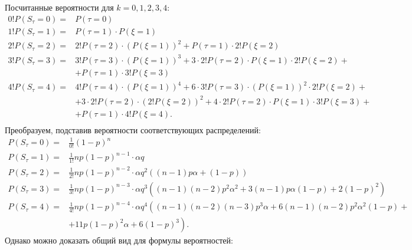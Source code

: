 \documentclass[12pt, specialist, subf, substylefile = spbu_report.rtx]{disser}
\begin{document}
	Посчитанные вероятности для $ k = 0, 1, 2, 3, 4 $:
	\[ 
	\begin{aligned}
		0! P(S _\tau = 0) =& P(\tau = 0)\\
		1! P(S _\tau = 1) =& P(\tau = 1) \cdot P(\xi = 1)\\
		2! P(S _\tau = 2) =& 2! P(\tau = 2) \cdot \left(P(\xi = 1)\right) ^2 + P(\tau = 1) \cdot 2!P(\xi = 2)\\
		3! P(S _\tau = 3) =& 3! P(\tau = 3) \cdot \left(P(\xi = 1)\right) ^3 + 3 \cdot 2!P(\tau = 2) \cdot P(\xi = 1) \cdot 2! P(\xi = 2) +\\
		&+ P(\tau = 1) \cdot 3!P(\xi = 3)\\
		4! P(S _\tau = 4) =& 4! P(\tau = 4) \cdot \left(P(\xi = 1)\right) ^4 + 6 \cdot 3! P(\tau = 3) \cdot \left(P(\xi = 1)\right) ^2 \cdot 2! P(\xi = 2) + \\
		&+ 3 \cdot 2! P(\tau = 2) \cdot \left(2! P(\xi = 2)\right) ^2 + 4 \cdot 2! P(\tau = 2) \cdot P(\xi = 1) \cdot 3! P(\xi = 3) +\\
		&+ P(\tau = 1) \cdot 4! P(\xi = 4).\\
	\end{aligned}
	\]
	Преобразуем, подставив вероятности соответствующих распределений:
	\[ 
	\begin{aligned}
		P(S _\tau = 0) =& \frac 1 {0!} (1 - p) ^n\\
		P(S _\tau = 1) =& \frac 1 {1!} n p (1 - p) ^{n - 1} \cdot \alpha q\\
		P(S _\tau = 2) =& \frac 1 {2!} n p (1 - p) ^{n - 2} \cdot \alpha q ^2 \left( (n - 1) p \alpha + (1 - p) \right)\\
		P(S _\tau = 3) =& \frac 1 {3!} n p (1 - p) ^{n - 3} \cdot \alpha q ^3 \left( (n - 1)(n - 2) p ^2 \alpha ^2 + 3 (n - 1) p \alpha (1 - p) + 2 (1 - p) ^2 \right)\\
		P(S _\tau = 4) =& \frac 1 {4!} n p (1 - p) ^{n - 4} \cdot \alpha q ^4 \left( (n - 1)(n - 2)(n - 3) p ^3 \alpha + 6 (n - 1)(n - 2) p ^2 \alpha ^2 (1 - p) +\right.\\
		&\left.+ 11 p (1 - p) ^2 \alpha + 6 (1 - p) ^3 \right).
	\end{aligned}
	\]
	Однако можно доказать общий вид для формулы вероятностей:
	
\end{document}
